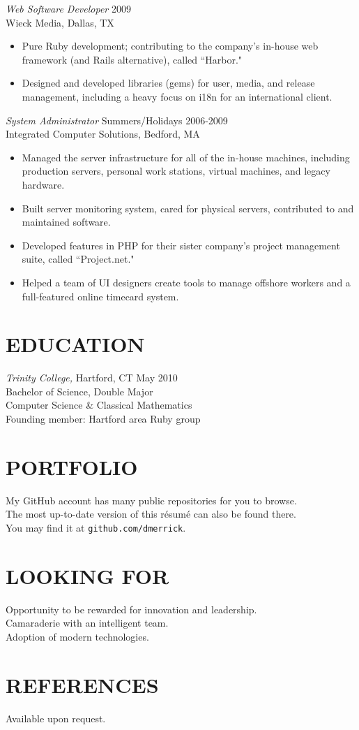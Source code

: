 \documentclass[line,margin]{res}
\begin{document}
\begin{resume}
  {\sl Web Software Developer}  \hfill 2009 \\
  Wieck Media,
  Dallas, TX
  \begin{itemize}  \itemsep -2pt %
    \item Pure Ruby development; contributing to the company's in-house web framework (and Rails alternative), called ``Harbor."
    \item Designed and developed libraries (gems) for user, media, and release management, including a heavy focus on i18n for an international client.
  \end{itemize}

  {\sl System Administrator}  \hfill Summers/Holidays 2006-2009 \\
  Integrated Computer Solutions,
  Bedford, MA
  \begin{itemize}  \itemsep -2pt %
       \item Managed the server infrastructure for all of the in-house machines, including production servers, personal work stations, virtual machines, and legacy hardware.
       \item Built server monitoring system, cared for physical servers, contributed to and maintained software.
       \item Developed features in PHP for their sister company's project management suite, called ``Project.net."
       \item Helped a team of UI designers create tools to manage offshore workers and a full-featured online timecard system.
  \end{itemize}

\section{EDUCATION}
  {\sl Trinity College,}
  Hartford, CT \hfill May 2010 \\
  Bachelor of Science, Double Major \\
  Computer Science \& Classical Mathematics \\
  Founding member: Hartford area Ruby group

\section{PORTFOLIO}
  My GitHub account has many public repositories for you to browse. \\
  The most up-to-date version of this r\'{e}sum\'{e} can also be found there. \\
  You may find it at \texttt{github.com/dmerrick}.

\section{LOOKING FOR}
  Opportunity to be rewarded for innovation and leadership. \\
  Camaraderie with an intelligent team. \\
  Adoption of modern technologies.

\section{REFERENCES}
  Available upon request.

\end{resume}
\end{document}

